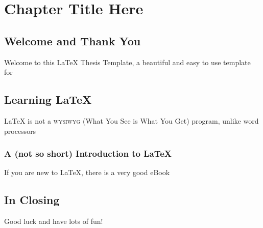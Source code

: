 
\chapter{Chapter Title Here} %

\label{Chapter1} %


\newcommand{\keyword}[1]{\textbf{#1}}
\newcommand{\tabhead}[1]{\textbf{#1}}
\newcommand{\code}[1]{\texttt{#1}}
\newcommand{\file}[1]{\texttt{\bfseries#1}}
\newcommand{\option}[1]{\texttt{\itshape#1}}


\section{Welcome and Thank You}
Welcome to this \LaTeX{} Thesis Template, a beautiful and easy to use template for


\section{Learning \LaTeX{}}

\LaTeX{} is not a \textsc{wysiwyg} (What You See is What You Get) program, unlike word processors

\subsection{A (not so short) Introduction to \LaTeX{}}

If you are new to \LaTeX{}, there is a very good eBook

\section{In Closing}
Good luck and have lots of fun!
